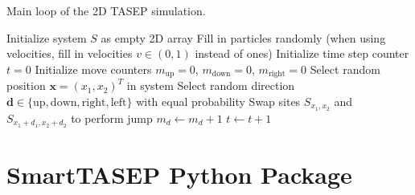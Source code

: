\begin{algorithm}[H]
    \caption{Main loop of the 2D TASEP simulation.}
    \label{alg:2d-tasep}
    \begin{algorithmic}
        \State Initialize system $S$ as empty 2D array
        \State Fill in particles randomly (when using velocities, fill in velocities $v\in (0,1)$ instead of ones)
        \State Initialize time step counter $t=0$
        \State Initialize move counters $m_{\text{up}}=0$, $m_{\text{down}}=0$, $m_{\text{right}}=0$
            \State Select random position $\bm{x}=(x_1,x_2)^T$ in system
                \State Select random direction $\bm{d} \in \{\text{up}, \text{down}, \text{right}, \text{left}\}$ with equal probability
                    \State Swap sites $S_{x_1,x_2}$ and $S_{x_1+d_1,x_2+d_2}$ to perform jump
                    \State $m_d \gets m_d + 1$
                \EndIf
            \EndIf
            \State $t \gets t+1$
        \EndWhile
\end{algorithmic}
\end{algorithm}

  
\section{SmartTASEP Python Package}
